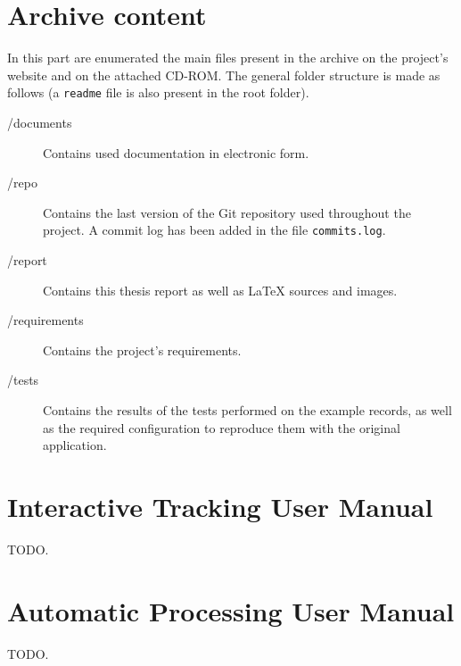 
\chapter{Archive content}
\label{chap:arch-content}

In this part are enumerated the main files present in the archive on the project's website and on the attached CD-ROM. The general folder structure is made as follows (a \texttt{readme} file is also present in the root folder).

\begin{description}
\item[/documents] Contains used documentation in electronic form.
\item[/repo] Contains the last version of the Git repository used throughout the project. A commit log has been added in the file \texttt{commits.log}.
\item[/report] Contains this thesis report as well as \LaTeX{} sources and images.
\item[/requirements] Contains the project's requirements.
\item[/tests] Contains the results of the tests performed on the example records, as well as the required configuration to reproduce them with the original application.
\end{description}


\chapter{Interactive Tracking User Manual}
\label{chap:usermanint}

TODO.

\chapter{Automatic Processing User Manual}
\label{chap:usermanauto}

TODO.